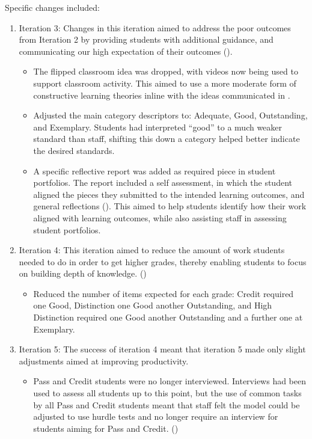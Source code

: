 Specific changes included: 
\begin{enumerate}
  \item Iteration 3: Changes in this iteration aimed to address the poor outcomes from Iteration 2 by providing students with additional guidance, and communicating our high expectation of their outcomes (). 
  \begin{itemize}[noitemsep,nolistsep]
    \item The flipped classroom idea was dropped, with videos now being used to support classroom activity. This aimed to use a more moderate form of constructive learning theories inline with the ideas communicated in .
    \item Adjusted the main category descriptors to: Adequate, Good, Outstanding, and Exemplary. Students had interpreted ``good'' to a much weaker standard than staff, shifting this down a category helped better indicate the desired standards. 
    \item A specific reflective report was added as required piece in student portfolios. The report included a self assessment, in which the student aligned the pieces they submitted to the intended learning outcomes, and general reflections (). This aimed to help students identify how their work aligned with learning outcomes, while also assisting staff in assessing student portfolios.
  \end{itemize}
  \item Iteration 4: This iteration aimed to reduce the amount of work students needed to do in order to get higher grades, thereby enabling students to focus on building depth of knowledge. ()
  \begin{itemize}[noitemsep,nolistsep]
    \item Reduced the number of items expected for each grade: Credit required one Good, Distinction one Good another Outstanding, and High Distinction required one Good another Outstanding and a further one at Exemplary.
  \end{itemize}
  \item Iteration 5: The success of iteration 4 meant that iteration 5 made only slight adjustments aimed at improving productivity.
  \begin{itemize}[noitemsep,nolistsep]
    \item Pass and Credit students were no longer interviewed. Interviews had been used to assess all students up to this point, but the use of common tasks by all Pass and Credit students meant that staff felt the model could be adjusted to use hurdle tests and no longer require an interview for students aiming for Pass and Credit. ()

\end{itemize}
\end{enumerate}
